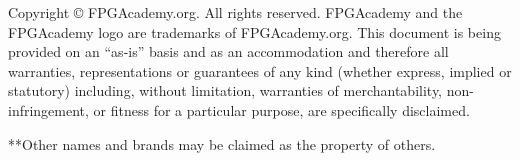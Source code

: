 %



\clearpage
\vspace{1in}

\noindent

Copyright {\copyright} FPGAcademy.org. All rights reserved. FPGAcademy and the FPGAcademy logo are trademarks of  FPGAcademy.org.  This document is being provided on an ``as-is'' basis and as an accommodation and therefore all warranties, representations or guarantees of any kind (whether express, implied or statutory) including, without limitation, warranties of merchantability, non-infringement, or fitness for a particular purpose, are specifically disclaimed.




**Other names and brands may be claimed as the property of others.


